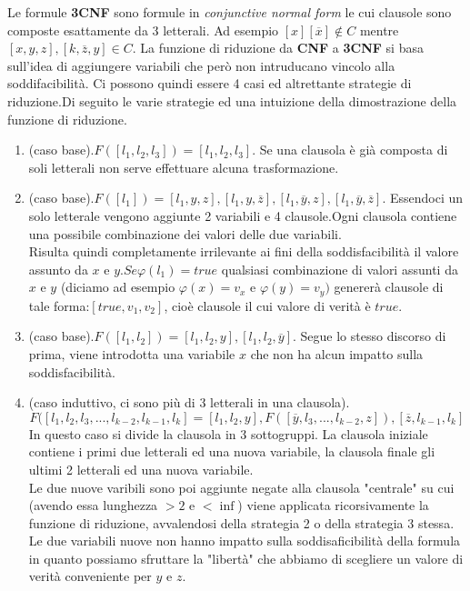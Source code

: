 \documentclass[a4paper]{article}
\begin{document}
Le formule \textbf{3CNF} sono formule in \textit{conjunctive normal form} le cui clausole sono composte esattamente da 3 letterali.
Ad esempio $[x][\overline x] \notin C$ mentre $[x,y,z],[k,\overline z, y] \in C$.
La funzione di riduzione da \textbf{CNF} a \textbf{3CNF} si basa sull'idea di aggiungere variabili che però non intruducano vincolo alla soddifacibilità.
Ci possono quindi essere 4 casi ed altrettante strategie di riduzione.Di seguito le varie strategie ed una intuizione della dimostrazione della funzione di riduzione.
\begin{enumerate}
	\item (caso base).$F([l_1,l_2,l_3]) = [l_1, l_2, l_3]$.
		Se una clausola è già composta di soli letterali non serve effettuare alcuna trasformazione.
	\item (caso base).$F([l_1])=[l_1,y,z],[l_1,y,\overline z],[l_1,\overline y,z],[l_1,\overline y,\overline z]$.
		Essendoci un solo letterale vengono aggiunte 2 variabili e 4 clausole.Ogni clausola contiene una possibile combinazione dei valori delle due variabili.\\
		Risulta quindi completamente irrilevante ai fini della soddisfacibilità il valore assunto da $x$ e $y$.$Se \varphi(l_1)=true$ qualsiasi combinazione di valori assunti da $x$ e $y$ (diciamo ad esempio $\varphi(x)=v_x$ e $\varphi(y)=v_y)$ genererà clausole di tale forma:$[true,v_1,v_2]$, cioè clausole il cui valore di verità è $true$.
	\item (caso base).$F([l_1,l_2])=[l_1,l_2,y],[l_1,l_2,\overline y]$. Segue lo stesso discorso di prima, viene introdotta una variabile $x$ che non ha alcun impatto sulla soddisfacibilità.
	\item (caso induttivo, ci sono più di 3 letterali in una clausola).
		$$F([l_1,l_2, l_3, ... ,l_{k-2}, l_{k-1}, l_k]=[l_1,l_2,y], F([\overline y, l_3, ... ,l_{k-2},z]) , [\overline z,l_{k-1},l_k]$$
		In questo caso si divide la clausola in 3 sottogruppi. La clausola iniziale contiene i primi due letterali ed una nuova variabile, la clausola finale gli ultimi 2 letterali ed una nuova variabile.\\
		Le due nuove varibili sono poi aggiunte negate alla clausola "centrale" su cui (avendo essa lunghezza $>2$ e $< \inf$) viene applicata ricorsivamente la funzione di riduzione, avvalendosi della strategia 2 o della strategia 3 stessa.
		Le due variabili nuove non hanno impatto sulla soddisaficibilità della formula in quanto possiamo sfruttare la "libertà" che abbiamo di scegliere un valore di verità conveniente per $y$ e $z$.\\

\end{enumerate}
\end{document}
